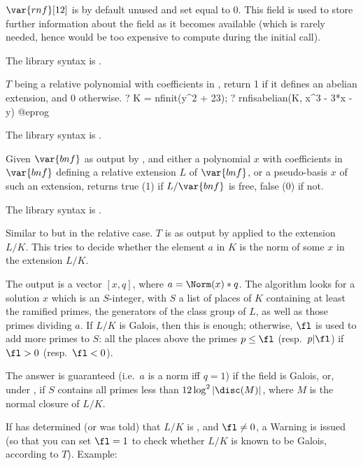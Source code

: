 $\var{rnf}[12]$ is by default unused and set equal to 0. This field is used
to store further information about the field as it becomes available (which
is rarely needed, hence would be too expensive to compute during the initial
 call).

The library syntax is .

\label{se:rnfisabelian}
$T$ being a relative polynomial with coefficients
in , return 1 if it defines an abelian extension, and 0 otherwise.
\bprog
? K = nfinit(y^2 + 23);
? rnfisabelian(K, x^3 - 3*x - y)
@eprog

The library syntax is .

\label{se:rnfisfree}
Given $\var{bnf}$ as output by
, and either a polynomial $x$ with coefficients in $\var{bnf}$
defining a relative extension $L$ of $\var{bnf}$, or a pseudo-basis $x$ of
such an extension, returns true (1) if $L/\var{bnf}$ is free, false (0) if
not.

The library syntax is .

\label{se:rnfisnorm}
Similar to
 but in the relative case. $T$ is as output by
 applied to the extension $L/K$. This tries to decide
whether the element $a$ in $K$ is the norm of some $x$ in the extension
$L/K$.

The output is a vector $[x,q]$, where $a = \Norm(x)*q$. The
algorithm looks for a solution $x$ which is an $S$-integer, with $S$ a list
of places of $K$ containing at least the ramified primes, the generators of
the class group of $L$, as well as those primes dividing $a$. If $L/K$ is
Galois, then this is enough; otherwise, $\fl$ is used to add more primes to
$S$: all the places above the primes $p \leq \fl$ (resp.~$p|\fl$) if $\fl>0$
(resp.~$\fl<0$).

The answer is guaranteed (i.e.~$a$ is a norm iff $q = 1$) if the field is
Galois, or, under , if $S$ contains all primes less than
$12\log^2\left|\disc(M)\right|$, where $M$ is the normal
closure of $L/K$.

If  has determined (or was told) that $L/K$ is
, and $\fl \neq 0$, a Warning is issued (so that you can set
$\fl = 1$ to check whether $L/K$ is known to be Galois, according to $T$).
Example:

